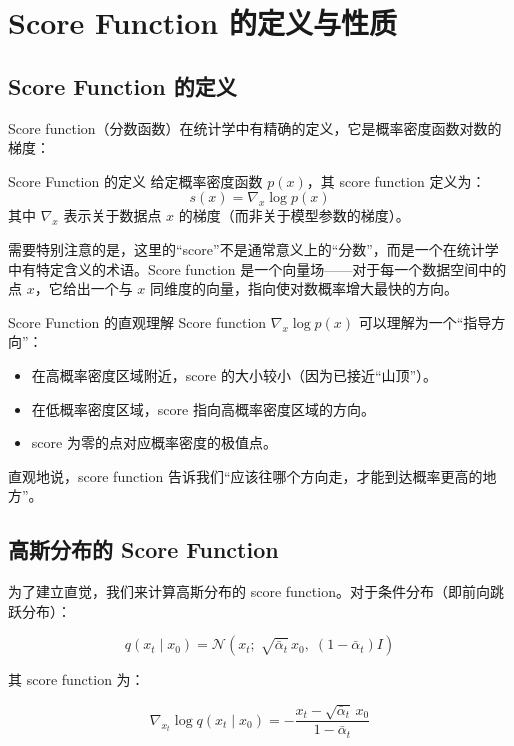 \section{Score Function 的定义与性质}

\subsection{Score Function 的定义}

Score function（分数函数）在统计学中有精确的定义，它是概率密度函数对数的梯度：

\begin{importantbox}{Score Function 的定义}
给定概率密度函数 $p(x)$，其 score function 定义为：
$$s(x) = \nabla_x \log p(x)$$
其中 $\nabla_x$ 表示关于数据点 $x$ 的梯度（而非关于模型参数的梯度）。
\end{importantbox}

需要特别注意的是，这里的``score''不是通常意义上的``分数''，而是一个在统计学中有特定含义的术语。Score function 是一个向量场——对于每一个数据空间中的点 $x$，它给出一个与 $x$ 同维度的向量，指向使对数概率增大最快的方向。

\begin{knowledgebox}{Score Function 的直观理解}
Score function $\nabla_x \log p(x)$ 可以理解为一个``指导方向''：
\begin{itemize}
    \item 在高概率密度区域附近，score 的大小较小（因为已接近``山顶''）。
    \item 在低概率密度区域，score 指向高概率密度区域的方向。
    \item score 为零的点对应概率密度的极值点。
\end{itemize}
直观地说，score function 告诉我们``应该往哪个方向走，才能到达概率更高的地方''。
\end{knowledgebox}

\subsection{高斯分布的 Score Function}

为了建立直觉，我们来计算高斯分布的 score function。对于条件分布（即前向跳跃分布）：

$$q(x_t \mid x_0) = \mathcal{N}(x_t;\; \sqrt{\bar{\alpha}_t}\, x_0,\; (1-\bar{\alpha}_t) I)$$

其 score function 为：

$$\nabla_{x_t} \log q(x_t \mid x_0) = -\frac{x_t - \sqrt{\bar{\alpha}_t}\, x_0}{1-\bar{\alpha}_t}$$

